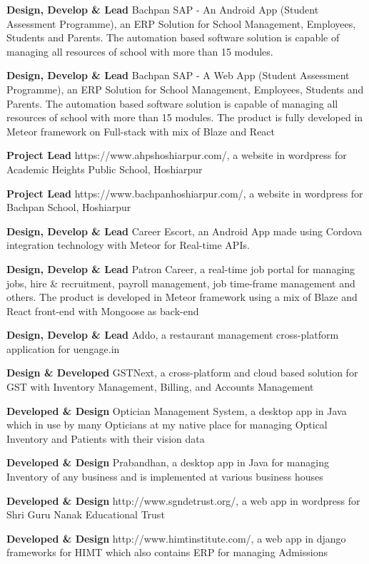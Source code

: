 \documentclass[margin,line]{res}
\begin{document}
\begin{resume}
\textbf{Design, Develop \& Lead} Bachpan SAP - An Android App (Student Assessment Programme), an ERP Solution for School Management, Employees, Students and Parents. The automation based software solution is capable of managing all resources of school with more than 15 modules.

\textbf{Design, Develop \& Lead} Bachpan SAP - A Web App (Student Assessment Programme), an ERP Solution for School Management, Employees, Students and Parents. The automation based software solution is capable of managing all resources of school with more than 15 modules. The product is fully developed in Meteor framework on Full-stack with mix of Blaze and React

\textbf{Project Lead} https://www.ahpshoshiarpur.com/, a website in wordpress for Academic Heights Public School, Hoshiarpur

\textbf{Project Lead} https://www.bachpanhoshiarpur.com/, a website in wordpress for Bachpan School, Hoshiarpur

\textbf{Design, Develop \& Lead} Career Escort, an Android App made using Cordova integration technology with Meteor for Real-time APIs.

\textbf{Design, Develop \& Lead} Patron Career, a real-time job portal for managing jobs, hire \& recruitment, payroll management, job time-frame management and others. The product is developed in Meteor framework using a mix of Blaze and React front-end with Mongoose as back-end

\textbf{Design, Develop \& Lead} Addo, a restaurant management cross-platform application for uengage.in 

\textbf{Design \& Developed} GSTNext, a cross-platform and cloud based solution for GST with Inventory Management, Billing, and Accounts Management

\textbf{Developed \& Design} Optician Management System, a desktop app in Java which in use by many Opticians at my native place for managing Optical Inventory and Patients with their vision data

\textbf{Developed \& Design} Prabandhan, a desktop app in Java for managing Inventory of any business and is implemented at various business houses

\textbf{Developed \& Design} http://www.sgndetrust.org/, a web app in wordpress for Shri Guru Nanak Educational Trust

\textbf{Developed \& Design} http://www.himtinstitute.com/, a web app in django frameworks for HIMT which also contains ERP for managing Admissions


\end{resume}
\end{document}
